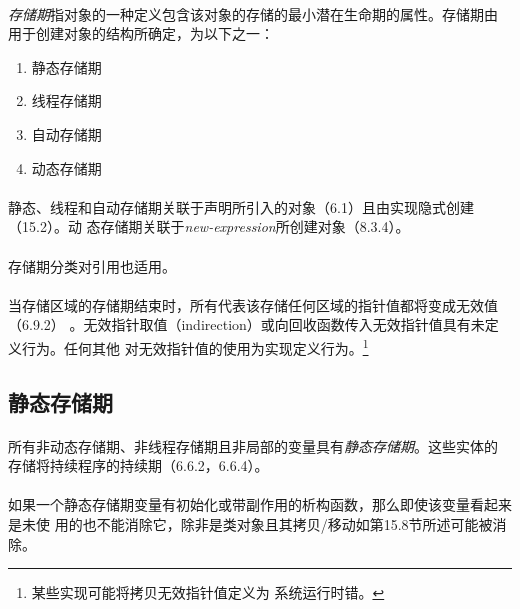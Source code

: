 \paragraph{}
\textit{存储期}指对象的一种定义包含该对象的存储的最小潜在生命期的属性。存储期由
用于创建对象的结构所确定，为以下之一：
\begin{enumerate}
  \item{静态存储期}
  \item{线程存储期}
  \item{自动存储期}
  \item{动态存储期}
\end{enumerate}

\paragraph{}
静态、线程和自动存储期关联于声明所引入的对象（6.1）且由实现隐式创建（15.2）。动
态存储期关联于\textit{new-expression}所创建对象（8.3.4）。

\paragraph{}
存储期分类对引用也适用。

\paragraph{}
当存储区域的存储期结束时，所有代表该存储任何区域的指针值都将变成无效值（6.9.2）
。无效指针取值（indirection）或向回收函数传入无效指针值具有未定义行为。任何其他
对无效指针值的使用为实现定义行为。\footnote{某些实现可能将拷贝无效指针值定义为
系统运行时错。}

\subsection{静态存储期}

\paragraph{}
所有非动态存储期、非线程存储期且非局部的变量具有\textit{静态存储期}。这些实体的
存储将持续程序的持续期（6.6.2，6.6.4）。

\paragraph{}
如果一个静态存储期变量有初始化或带副作用的析构函数，那么即使该变量看起来是未使
用的也不能消除它，除非是类对象且其拷贝/移动如第15.8节所述可能被消除。

